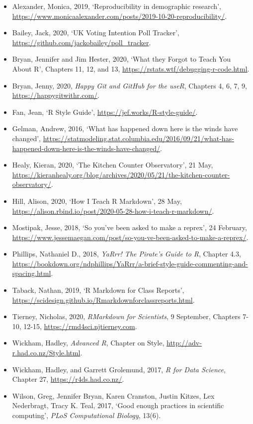 \documentclass[
]{book}
\providecommand{\tightlist}{%
  \setlength{\itemsep}{0pt}\setlength{\parskip}{0pt}}
\begin{document}
\begin{itemize}
\tightlist
\item
  Alexander, Monica, 2019, `Reproducibility in demographic research', \url{https://www.monicaalexander.com/posts/2019-10-20-reproducibility/}.
\item
  Bailey, Jack, 2020, `UK Voting Intention Poll Tracker', \url{https://github.com/jackobailey/poll_tracker}.
\item
  Bryan, Jennifer and Jim Hester, 2020, `What they Forgot to Teach You About R', Chapters 11, 12, and 13, \url{https://rstats.wtf/debugging-r-code.html}.
\item
  Bryan, Jenny, 2020, \emph{Happy Git and GitHub for the useR}, Chapters 4, 6, 7, 9, \url{https://happygitwithr.com/}.
\item
  Fan, Jean, `R Style Guide', \url{https://jef.works/R-style-guide/}.
\item
  Gelman, Andrew, 2016, `What has happened down here is the winds have changed', \url{https://statmodeling.stat.columbia.edu/2016/09/21/what-has-happened-down-here-is-the-winds-have-changed/}.
\item
  Healy, Kieran, 2020, `The Kitchen Counter Observatory', 21 May, \url{https://kieranhealy.org/blog/archives/2020/05/21/the-kitchen-counter-observatory/}.
\item
  Hill, Alison, 2020, `How I Teach R Markdown', 28 May, \url{https://alison.rbind.io/post/2020-05-28-how-i-teach-r-markdown/}.
\item
  Mostipak, Jesse, 2018, `So you've been asked to make a reprex', 24 February, \url{https://www.jessemaegan.com/post/so-you-ve-been-asked-to-make-a-reprex/}.
\item
  Phillips, Nathaniel D., 2018, \emph{YaRrr! The Pirate's Guide to R}, Chapter 4.3, \url{https://bookdown.org/ndphillips/YaRrr/a-brief-style-guide-commenting-and-spacing.html}.
\item
  Taback, Nathan, 2019, `R Markdown for Class Reports', \url{https://scidesign.github.io/Rmarkdownforclassreports.html}.
\item
  Tierney, Nicholas, 2020, \emph{RMarkdown for Scientists}, 9 September, Chapters 7-10, 12-15, \url{https://rmd4sci.njtierney.com}.
\item
  Wickham, Hadley, \emph{Advanced R}, Chapter on Style, \url{http://adv-r.had.co.nz/Style.html}.
\item
  Wickham, Hadley, and Garrett Grolemund, 2017, \emph{R for Data Science}, Chapter 27, \url{https://r4ds.had.co.nz/}.
\item
  Wilson, Greg, Jennifer Bryan, Karen Cranston, Justin Kitzes, Lex Nederbragt, Tracy K. Teal, 2017, `Good enough practices in scientific computing', \emph{PLoS Computational Biology}, 13(6).
\end{itemize}
\end{document}
